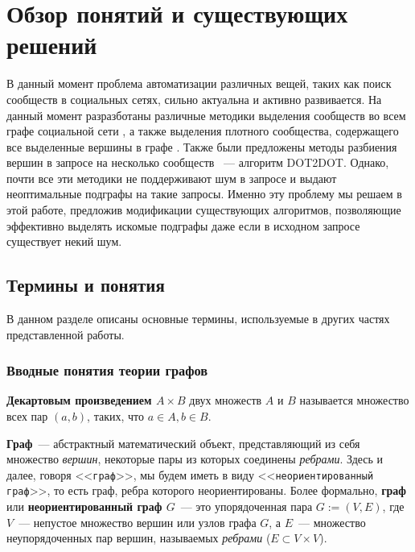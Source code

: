 \chapter{Обзор понятий и существующих решений}

\startrelatedwork

В данный момент проблема автоматизации различных вещей, таких как поиск сообществ в социальных сетях, сильно актуальна и активно развивается. На данный момент разразботаны различные методики выделения сообществ во всем графе социальной сети \cite{Newman04, Newman06, Fortunato10, Cui13}, а также выделения плотного сообщества, содержащего все выделенные вершины в графе \cite{Faloutsos06, Wiener15, Huang15, Barbieri15}. Также были предложены методы разбиения вершин в запросе на несколько сообществ \cite{Akoglu13}~--- алгоритм DOT2DOT. Однако, почти все эти методики не поддерживают шум в запросе и выдают неоптимальные подграфы на такие запросы. Именно эту проблему мы решаем в этой работе, предложив модификации существующих алгоритмов, позволяющие эффективно выделять искомые подграфы даже если в исходном запросе существует некий шум.

\section{Термины и понятия}

В данном разделе описаны основные термины, используемые в других частях представленной работы.

\subsection{Вводные понятия теории графов}

\textbf{Декартовым произведением $A \times B$} двух множеств $A$ и $B$ называется множество всех пар $(a, b)$, таких, что $a \in A, b \in B$.

\textbf{Граф}~--- абстрактный математический объект, представляющий из себя множество \textit{вершин}, некоторые пары из которых соединены \textit{ребрами}. Здесь и далее, говоря <<\texttt{граф}>>, мы будем иметь в виду <<\texttt{неориентированный граф}>>, то есть граф, ребра которого неориентированы. Более формально, \textbf{граф} или \textbf{неориентированный граф $G$}~--- это упорядоченная пара $G := (V, E)$, где $V$~--- непустое множество вершин или узлов графа $G$, а $E$~--- множество неупорядоченных пар вершин, называемых \textit{ребрами} ($E \subset V \times V$).

